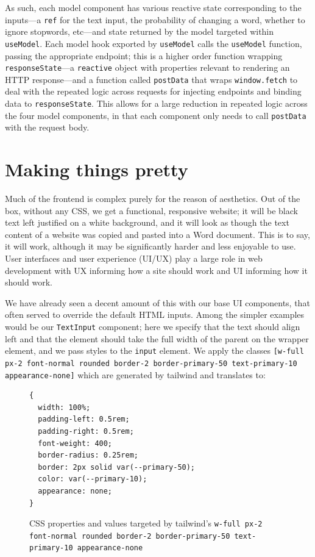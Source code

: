 \documentclass[11pt, twoside, reqno]{book}
\begin{document}
As such, each model component has various reactive state corresponding to the inputs—a \texttt{ref} for the text input, the probability of changing a word, whether to ignore stopwords, etc—and state returned by the model targeted within \texttt{useModel}. Each model hook exported by \texttt{useModel} calls the \texttt{useModel} function, passing the appropriate endpoint; this is a higher order function wrapping \texttt{responseState}—a \texttt{reactive} object with properties relevant to rendering an HTTP response—and a function called \texttt{postData} that wraps \texttt{window.fetch} to deal with the repeated logic across requests for injecting endpoints and binding data to \texttt{responseState}. This allows for a large reduction in repeated logic across the four model components, in that each component only needs to call \texttt{postData} with the request body.

\section{Making things pretty}

Much of the frontend is complex purely for the reason of aesthetics. Out of the box, without any CSS, we get a functional, responsive website; it will be black text left justified on a white background, and it will look as though the text content of a website was copied and pasted into a Word document. This is to say, it will work, although it may be significantly harder and less enjoyable to use. User interfaces and user experience (UI/UX) play a large role in web development with UX informing how a site should work and UI informing how it should work.

We have already seen a decent amount of this with our base UI components, that often served to override the default HTML inputs. Among the simpler examples would be our \texttt{TextInput} component; here we specify that the text should align left and that the element should take the full width of the parent on the wrapper element, and we pass styles to the \texttt{input} element. We apply the classes \texttt{[w-full px-2 font-normal rounded border-2 border-primary-50 text-primary-10 appearance-none]} which are generated by tailwind and translates to:
\begin{figure}[h!]
\begin{lstlisting}[language=XML]
{
  width: 100%;
  padding-left: 0.5rem; 
  padding-right: 0.5rem;
  font-weight: 400;
  border-radius: 0.25rem;
  border: 2px solid var(--primary-50);
  color: var(--primary-10);
  appearance: none;
}
\end{lstlisting}
\caption{CSS properties and values targeted by tailwind's \texttt{w-full px-2 font-normal rounded border-2 border-primary-50 text-primary-10 appearance-none}}
\end{figure}
\end{document}
